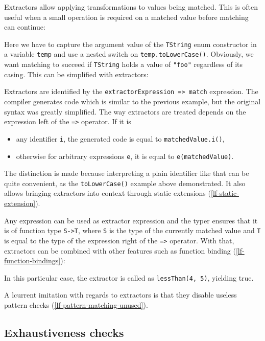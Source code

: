 \documentclass[a4paper,oneside]{book}
\newcommand{\type}[1]{\texttt{#1}}
\newcommand{\expr}[1]{\texttt{#1}}
\newcommand{\tref}[2]{#1 (\ref{#2})}
\newcommand{\haxe}[2][]{%
}
\begin{document}
Extractors allow applying transformations to values being matched. This is often useful when a small operation is required on a matched value before matching can continue:

\haxe{assets/Extractor2.hx}

Here we have to capture the argument value of the \expr{TString} enum constructor in a variable \expr{temp} and use a nested switch on \expr{temp.toLowerCase()}. Obviously, we want matching to succeed if \expr{TString} holds a value of \expr{"foo"} regardless of its casing. This can be simplified with extractors:

\haxe{assets/Extractor.hx}

Extractors are identified by the \expr{extractorExpression => match} expression. The compiler generates code which is similar to the previous example, but the original syntax was greatly simplified. The way extractors are treated depends on the expression left of the \expr{=>} operator. If it is

\begin{itemize}
	\item any identifier \expr{i}, the generated code is equal to \expr{matchedValue.i()},
	\item otherwise for arbitrary expressions \expr{e}, it is equal to \expr{e(matchedValue)}.
\end{itemize}

The distinction is made because interpreting a plain identifier like that can be quite convenient, as the \expr{toLowerCase()} example above demonstrated. It also allows bringing extractors into context through \tref{static extensions}{lf-static-extension}.

Any expression can be used as extractor expression and the typer ensures that it is of function type \type{S->T}, where \type{S} is the type of the currently matched value and \type{T} is equal to the type of the expression right of the \expr{=>} operator. With that, extractors can be combined with other features such as \tref{function binding}{lf-function-bindings}:

\haxe{assets/Extractor3.hx}

In this particular case, the extractor is called as \expr{lessThan(4, 5)}, yielding true.

A lcurrent imitation with regards to extractors is that they disable \tref{useless pattern checks}{lf-pattern-matching-unused}.


\subsection{Exhaustiveness checks}
\label{lf-pattern-matching-exhaustiveness}
\end{document}

